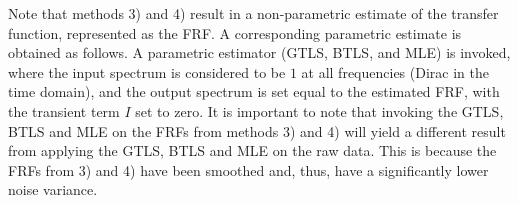 \begin{remark}
Note that methods 3) and 4) result in a non-parametric estimate of the transfer function, represented as the \gls{FRF}. 
A corresponding parametric estimate is obtained as follows. 
A parametric estimator (GTLS, BTLS, and MLE) is invoked, where the input spectrum is considered to be $1$ at all frequencies (Dirac in the time domain), and the output spectrum is set equal to the estimated FRF, with the transient term $I$ set to zero. It is important to note that invoking the GTLS, BTLS and MLE on the FRFs from methods 3) and 4) will yield a different result from applying the GTLS, BTLS and MLE on the raw data. This is because the FRFs from 3) and 4) have been smoothed and, thus, have a significantly lower noise variance.
\end{remark}





 
 

